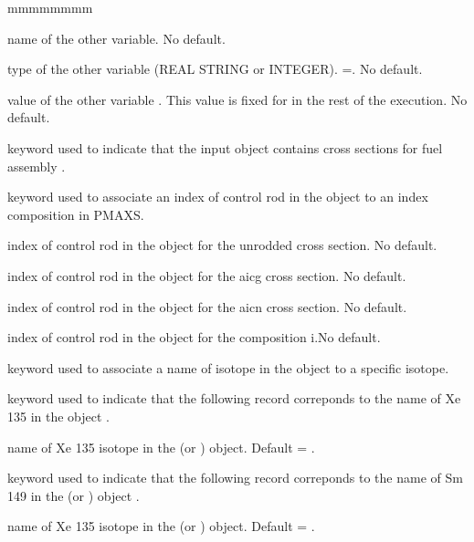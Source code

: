 \begin{ListeDeDescription}{mmmmmmmm}
\item[\dusa{othpk}]  name of the other variable. No default.

\item[\dusa{othtyp}]  type of the other variable (REAL STRING or INTEGER). =. No default.

\item[\dusa{othval}]  value of the other variable . This value is fixed for in the rest of the execution. No default.
\item[\moc{FUEL}] keyword used to indicate that the input  object contains cross sections for fuel assembly .

\item[\moc{BARR}]  keyword used to associate an index of control rod in the  object to an index composition in PMAXS.

\item[\dusa{unrodded}] index of control rod in the  object for the unrodded cross section. No default.

\item[\dusa{aicg}] index of control rod in the  object for the aicg cross section. No default.

\item[\dusa{aicn}] index of control rod in the  object for the aicn cross section. No default.

\item[\dusa{compo}] index of control rod in the  object for the composition i.No default. 

\item[\moc{ISOTOPES}]  keyword used to associate a name of isotope in the  object to a specific isotope.

\item[\moc{XE135}]  keyword used to indicate that the following record correponds to the name of Xe 135 in the  object .

\item[\dusa{xenam}]  name of Xe 135 isotope in the  (or )   object. Default  = 
.

\item[\moc{SM149}]  keyword used to indicate that the following record correponds to the name of Sm 149 in the  (or )   object .

\item[\dusa{smnam}]  name of Xe 135 isotope in the  (or )   object. Default  = 
.


\end{ListeDeDescription}
